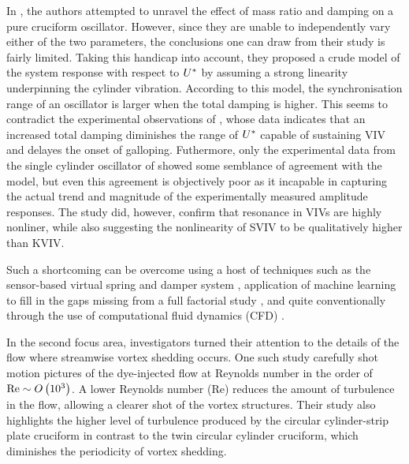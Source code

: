 \documentclass[oneside]{utmthesis}
\begin{document}
In \citet{Nguyen2012}, the authors attempted to unravel the effect of mass ratio and damping on a pure cruciform oscillator. However, since they are unable to independently vary either of the two parameters, the conclusions one can draw from their study is fairly limited. Taking this handicap into account, they proposed a crude model of the system response with respect to $U^{*}$ by assuming a strong linearity underpinning the cylinder vibration. According to this model, the synchronisation range of an oscillator is larger when the total damping is higher. This seems to contradict the experimental observations of \citet{Sun2016}, whose data indicates that an increased total damping diminishes the range of $U^{*}$ capable of sustaining VIV and delayes the onset of galloping. Futhermore, only the experimental data from the single cylinder oscillator of \citet{Nguyen2012} showed some semblance of agreement with the model, but even this agreement is objectively poor as it incapable in capturing the actual trend and magnitude of the experimentally measured amplitude responses. The study did, however, confirm that resonance in VIVs are highly nonliner, while also suggesting the nonlinearity of SVIV to be qualitatively higher than KVIV. 

Such a shortcoming can be overcome using a host of techniques such as the sensor-based virtual spring and damper system \citep{Garcia2018,Sun2018}, application of machine learning to fill in the gaps missing from a full factorial study \citep{Wu2018,Ren2019,Raissi2019,Hu2020}, and quite conventionally through the use of computational fluid dynamics (CFD) \citep{Wu2011c,Zhang2018a}.

In the second focus area, investigators turned their attention to the details of the flow where streamwise vortex shedding occurs. One such study carefully shot motion pictures of the dye-injected flow \citep{Koide2017} at Reynolds number in the order of $\text{Re} \sim O\left( 10^{3} \right)$. A lower Reynolds number (Re) reduces the amount of turbulence in the flow, allowing a clearer shot of the vortex structures. Their study also highlights the higher level of turbulence produced by the circular cylinder-strip plate cruciform in contrast to the twin circular cylinder cruciform, which diminishes the periodicity of vortex shedding.
\end{document}
